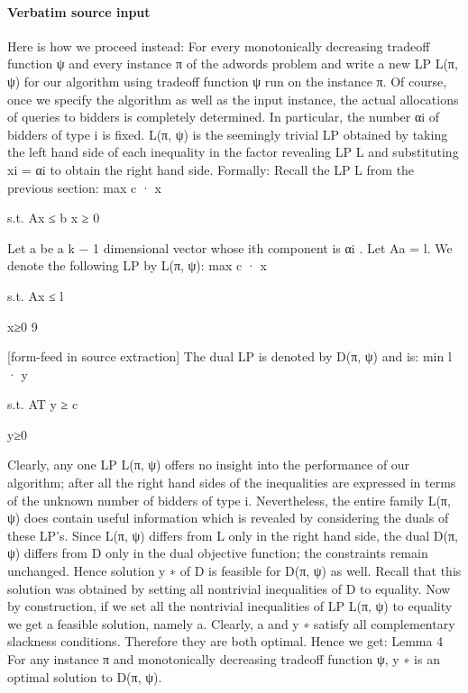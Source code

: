 \documentclass[10pt]{article}
\begin{document}
\paragraph{Verbatim source input}
\begin{ReviewVerbatim}
Here is how we proceed instead: For every monotonically decreasing tradeoff function ψ and
every instance π of the adwords problem and write a new LP L(π, ψ) for our algorithm using
tradeoff function ψ run on the instance π. Of course, once we specify the algorithm as well
as the input instance, the actual allocations of queries to bidders is completely determined.
In particular, the number αi of bidders of type i is fixed. L(π, ψ) is the seemingly trivial
LP obtained by taking the left hand side of each inequality in the factor revealing LP L and
substituting xi = αi to obtain the right hand side. Formally:
Recall the LP L from the previous section:
max c · x

s.t. Ax ≤ b x ≥ 0

Let a be a k − 1 dimensional vector whose ith component is αi . Let Aa = l. We denote the
following LP by L(π, ψ):
max c · x

s.t. Ax ≤ l

x≥0
9


[form-feed in source extraction]
The dual LP is denoted by D(π, ψ) and is:
min l · y

s.t. AT y ≥ c

y≥0

Clearly, any one LP L(π, ψ) offers no insight into the performance of our algorithm; after
all the right hand sides of the inequalities are expressed in terms of the unknown number of
bidders of type i. Nevertheless, the entire family L(π, ψ) does contain useful information which
is revealed by considering the duals of these LP’s.
Since L(π, ψ) differs from L only in the right hand side, the dual D(π, ψ) differs from D only
in the dual objective function; the constraints remain unchanged. Hence solution y ∗ of D is
feasible for D(π, ψ) as well. Recall that this solution was obtained by setting all nontrivial
inequalities of D to equality.
Now by construction, if we set all the nontrivial inequalities of LP L(π, ψ) to equality we get a
feasible solution, namely a. Clearly, a and y ∗ satisfy all complementary slackness conditions.
Therefore they are both optimal. Hence we get:
Lemma 4 For any instance π and monotonically decreasing tradeoff function ψ, y ∗ is an
optimal solution to D(π, ψ).
\end{ReviewVerbatim}
\end{document}
